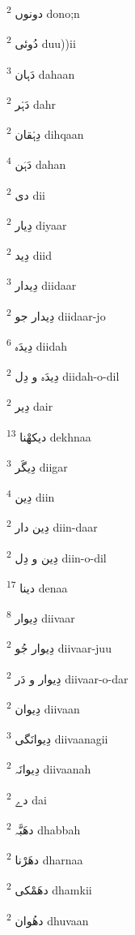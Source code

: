 \documentclass[12pt]{article}
\begin{document}
\begin{multicols}{5}
{\ur دونوں}   \textsuperscript{2} dono;n

{\ur دُوئی}   \textsuperscript{2} duu))ii

{\ur دَہان}   \textsuperscript{3} dahaan

{\ur دَہْر}   \textsuperscript{2} dahr

{\ur دِہْقان}   \textsuperscript{2} dihqaan

{\ur دَہَن}   \textsuperscript{4} dahan

{\ur دی}   \textsuperscript{2} dii

{\ur دِیار}   \textsuperscript{2} diyaar

{\ur دِید}   \textsuperscript{2} diid

{\ur دِیدار}   \textsuperscript{3} diidaar

{\ur دِیدار جو}   \textsuperscript{2} diidaar-jo

{\ur دِیدَہ}   \textsuperscript{6} diidah

{\ur دِیدَہ و دِل}   \textsuperscript{2} diidah-o-dil

{\ur دِیر}   \textsuperscript{2} dair

{\ur دیکھْنا}   \textsuperscript{13} dekhnaa

{\ur دِیگَر}   \textsuperscript{3} diigar

{\ur دِین}   \textsuperscript{4} diin

{\ur دِین دار}   \textsuperscript{2} diin-daar

{\ur دِین و دِل}   \textsuperscript{2} diin-o-dil

{\ur دینا}   \textsuperscript{17} denaa

{\ur دِیوار}   \textsuperscript{8} diivaar

{\ur دِیوار جُو}   \textsuperscript{2} diivaar-juu

{\ur دِیوار و دَر}   \textsuperscript{2} diivaar-o-dar

{\ur دِیوان}   \textsuperscript{2} diivaan

{\ur دِیوانَگی}   \textsuperscript{3} diivaanagii

{\ur دِیوانَہ}   \textsuperscript{2} diivaanah

{\ur دے}   \textsuperscript{2} dai

{\ur دھَبَّہ}   \textsuperscript{2} dhabbah

{\ur دھَرْنا}   \textsuperscript{2} dharnaa

{\ur دھَمْکی}   \textsuperscript{2} dhamkii

{\ur دھُوان}   \textsuperscript{2} dhuvaan


\end{multicols}
\end{document}
